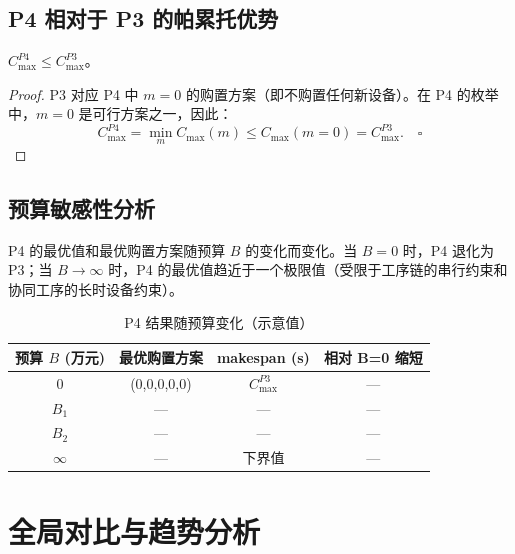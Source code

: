 \documentclass[UTF8,a4paper,12pt]{ctexart}
\begin{document}
\subsection{P4 相对于 P3 的帕累托优势}
\begin{proposition}[P4 的帕累托优势]
$C_{\max}^{P4} \leq C_{\max}^{P3}$。
\end{proposition}

\begin{proof}
P3 对应 P4 中 $m = 0$ 的购置方案（即不购置任何新设备）。在 P4 的枚举中，$m = 0$ 是可行方案之一，因此：
\begin{equation}
C_{\max}^{P4} = \min_{m} C_{\max}(m) \leq C_{\max}(m=0) = C_{\max}^{P3}. \quad \square \tag{11-5}
\end{equation}
\end{proof}

\subsection{预算敏感性分析}
P4 的最优值和最优购置方案随预算 $B$ 的变化而变化。当 $B = 0$ 时，P4 退化为 P3；当 $B \to \infty$ 时，P4 的最优值趋近于一个极限值（受限于工序链的串行约束和协同工序的长时设备约束）。

\begin{table}[htbp]
  \centering
  \caption{P4 结果随预算变化（示意值）}
  \label{tab:p4_budget_sensitivity}
  \begin{tabular}{cccc}
    \toprule
    预算 $B$ (万元) & 最优购置方案 & makespan (s) & 相对 B=0 缩短 \\
    \midrule
    0 & (0,0,0,0,0) & $C_{\max}^{P3}$ & — \\
    $B_1$ & — & — & — \\
    $B_2$ & — & — & — \\
    $\infty$ & — & 下界值 & — \\
    \bottomrule
  \end{tabular}
\end{table}

\section{全局对比与趋势分析}
\end{document}
